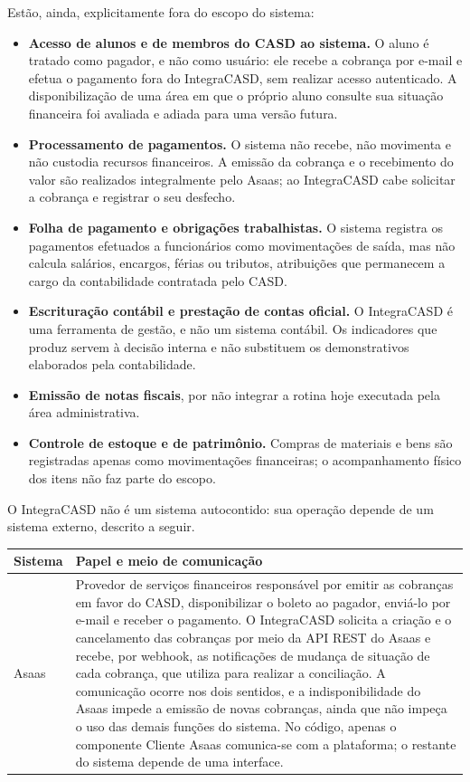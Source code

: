 \documentclass[11pt,a4paper,oneside]{report}
\begin{document}
Estão, ainda, explicitamente fora do escopo do sistema:
\begin{itemize}
  \item \textbf{Acesso de alunos e de membros do CASD ao sistema.} O aluno é tratado como pagador,
        e não como usuário: ele recebe a cobrança por e-mail e efetua o pagamento fora do
        IntegraCASD, sem realizar acesso autenticado. A disponibilização de uma área em que o
        próprio aluno consulte sua situação financeira foi avaliada e adiada para uma versão
        futura.
  \item \textbf{Processamento de pagamentos.} O sistema não recebe, não movimenta e não custodia
        recursos financeiros. A emissão da cobrança e o recebimento do valor são realizados
        integralmente pelo Asaas; ao IntegraCASD cabe solicitar a cobrança e registrar o seu
        desfecho.
  \item \textbf{Folha de pagamento e obrigações trabalhistas.} O sistema registra os pagamentos
        efetuados a funcionários como movimentações de saída, mas não calcula salários, encargos,
        férias ou tributos, atribuições que permanecem a cargo da contabilidade contratada pelo
        CASD.
  \item \textbf{Escrituração contábil e prestação de contas oficial.} O IntegraCASD é uma
        ferramenta de gestão, e não um sistema contábil. Os indicadores que produz servem à
        decisão interna e não substituem os demonstrativos elaborados pela contabilidade.
  \item \textbf{Emissão de notas fiscais}, por não integrar a rotina hoje executada pela área
        administrativa.
  \item \textbf{Controle de estoque e de patrimônio.} Compras de materiais e bens são registradas
        apenas como movimentações financeiras; o acompanhamento físico dos itens não faz parte do
        escopo.
\end{itemize}

O IntegraCASD não é um sistema autocontido: sua operação depende de um sistema externo, descrito a
seguir.

\begin{tabularx}{\linewidth}{@{}l X@{}}
  \toprule
  \textbf{Sistema} & \textbf{Papel e meio de comunicação} \\
  \midrule
  Asaas & Provedor de serviços financeiros responsável por emitir as cobranças em favor do CASD,
          disponibilizar o boleto ao pagador, enviá-lo por e-mail e receber o pagamento. O
          IntegraCASD solicita a criação e o cancelamento das cobranças por meio da API REST do
          Asaas e recebe, por webhook, as notificações de mudança de situação de cada cobrança, que
          utiliza para realizar a conciliação. A comunicação ocorre nos dois sentidos, e a
          indisponibilidade do Asaas impede a emissão de novas cobranças, ainda que não impeça o uso
          das demais funções do sistema. No código, apenas o componente Cliente Asaas comunica-se
          com a plataforma; o restante do sistema depende de uma interface. \\
  \bottomrule
\end{tabularx}
\end{document}
